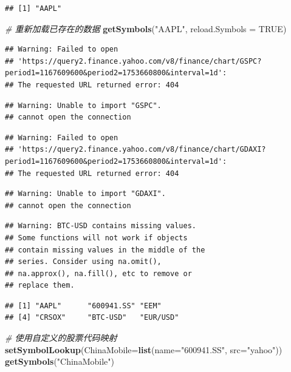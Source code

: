 \documentclass[]{ctexbook}
\newenvironment{Shaded}{\begin{snugshade}}{\end{snugshade}}
\newcommand{\AttributeTok}[1]{\textcolor[rgb]{0.13,0.29,0.53}{#1}}
\newcommand{\CommentTok}[1]{\textcolor[rgb]{0.56,0.35,0.01}{\textit{#1}}}
\newcommand{\ConstantTok}[1]{\textcolor[rgb]{0.56,0.35,0.01}{#1}}
\newcommand{\FunctionTok}[1]{\textcolor[rgb]{0.13,0.29,0.53}{\textbf{#1}}}
\newcommand{\NormalTok}[1]{#1}
\newcommand{\StringTok}[1]{\textcolor[rgb]{0.31,0.60,0.02}{#1}}
\begin{document}
\begin{verbatim}
## [1] "AAPL"
\end{verbatim}

\begin{Shaded}
\begin{Highlighting}[]
\CommentTok{\# 重新加载已存在的数据}
\FunctionTok{getSymbols}\NormalTok{(}\StringTok{"AAPL"}\NormalTok{, }\AttributeTok{reload.Symbols =} \ConstantTok{TRUE}\NormalTok{)}
\end{Highlighting}
\end{Shaded}

\begin{verbatim}
## Warning: Failed to open
## 'https://query2.finance.yahoo.com/v8/finance/chart/GSPC?period1=1167609600&period2=1753660800&interval=1d':
## The requested URL returned error: 404
\end{verbatim}

\begin{verbatim}
## Warning: Unable to import "GSPC".
## cannot open the connection
\end{verbatim}

\begin{verbatim}
## Warning: Failed to open
## 'https://query2.finance.yahoo.com/v8/finance/chart/GDAXI?period1=1167609600&period2=1753660800&interval=1d':
## The requested URL returned error: 404
\end{verbatim}

\begin{verbatim}
## Warning: Unable to import "GDAXI".
## cannot open the connection
\end{verbatim}

\begin{verbatim}
## Warning: BTC-USD contains missing values.
## Some functions will not work if objects
## contain missing values in the middle of the
## series. Consider using na.omit(),
## na.approx(), na.fill(), etc to remove or
## replace them.
\end{verbatim}

\begin{verbatim}
## [1] "AAPL"      "600941.SS" "EEM"      
## [4] "CRSOX"     "BTC-USD"   "EUR/USD"
\end{verbatim}

\begin{Shaded}
\begin{Highlighting}[]
\CommentTok{\# 使用自定义的股票代码映射}
\FunctionTok{setSymbolLookup}\NormalTok{(}\AttributeTok{ChinaMobile=}\FunctionTok{list}\NormalTok{(}\AttributeTok{name=}\StringTok{"600941.SS"}\NormalTok{, }\AttributeTok{src=}\StringTok{"yahoo"}\NormalTok{))}
\FunctionTok{getSymbols}\NormalTok{(}\StringTok{"ChinaMobile"}\NormalTok{)}
\end{Highlighting}
\end{Shaded}
\end{document}
